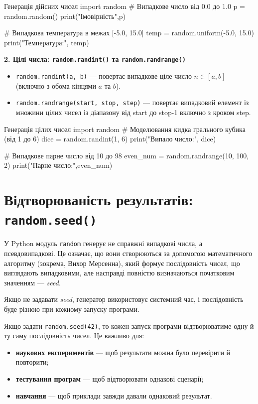 \begin{py}{Генерація дійсних чисел}
import random
# Випадкове число від 0.0 до 1.0
p = random.random()
print("Імовірність",p)

# Випадкова температура в межах [-5.0, 15.0]
temp = random.uniform(-5.0, 15.0)
print("Температура:", temp)
\end{py}

\vspace{0.5em}

\noindent\textbf{2. Цілі числа: \texttt{random.randint()} та \texttt{random.randrange()}}

\begin{itemize}
	\item \texttt{random.randint(a, b)} — повертає випадкове ціле число $n \in [a, b]$ (включно з обома кінцями $a$ та $b$).
	\item \texttt{random.randrange(start, stop, step)} — повертає випадковий елемент із множини цілих чисел із діапазону від start до stop-1 включно з кроком step.
\end{itemize}

\begin{py}{Генерація цілих чисел}
import random
# Моделювання кидка грального кубика (від 1 до 6)
dice = random.randint(1, 6)
print("Випало число:", dice)

# Випадкове парне число від 10 до 98
even_num = random.randrange(10, 100, 2)
print("Парне число:",even_num)
\end{py}

\vspace{0.5em}




\section*{Відтворюваність результатів: \texttt{random.seed()}}


У Python модуль \texttt{random} генерує не справжні випадкові числа, а псевдовипадкові. Це означає, що вони створюються за допомогою математичного алгоритму (зокрема, Вихор Мерсенна), який формує послідовність чисел, що виглядають випадковими, але насправді повністю визначаються початковим значенням — \textit{seed}.

Якщо не задавати \textit{seed}, генератор використовує системний час, і послідовність буде різною при кожному запуску програми.

Якщо задати \texttt{random.seed(42)}, то кожен запуск програми відтворюватиме одну й ту саму послідовність чисел. Це важливо для:
\begin{itemize}
	\item \textbf{наукових експериментів} — щоб результати можна було перевірити й повторити;
	\item \textbf{тестування програм} — щоб відтворювати однакові сценарії;
	\item \textbf{навчання} — щоб приклади завжди давали однаковий результат.
\end{itemize}

